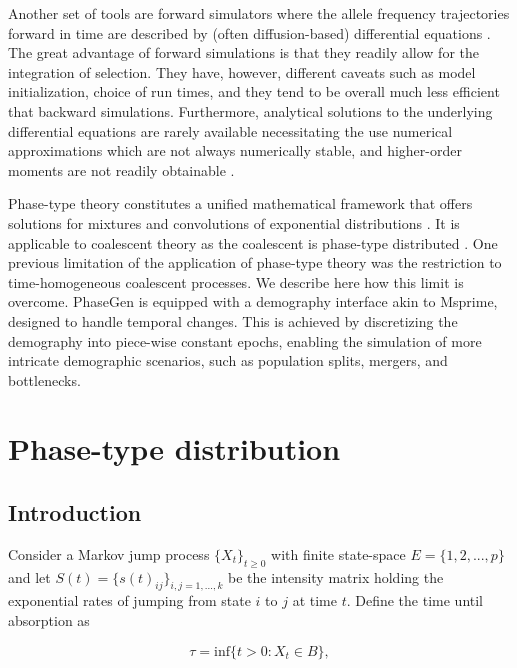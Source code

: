 \documentclass[hidelinks,11pt]{article}
\begin{document}
Another set of tools are forward simulators where the allele frequency trajectories forward in time are described by (often diffusion-based) differential equations \citep{dadi,moments}. 
The great advantage of forward simulations is that they readily allow for the integration of selection. They have, however, different caveats such as model initialization, choice of run times, and they tend to be overall much less efficient that backward simulations. %
Furthermore, analytical solutions to the underlying differential equations are rarely available necessitating the use numerical approximations which are not always numerically stable, and higher-order moments are not readily obtainable \citep{moments}. %

Phase-type theory constitutes a unified mathematical framework that offers solutions for mixtures and convolutions of exponential distributions \citep{phasetype}. 
It is applicable to coalescent theory as the coalescent is phase-type distributed \citep{phasetype_popgen}. 
One previous limitation of the application of phase-type theory was the restriction to time-homogeneous coalescent processes.
We describe here how this limit is overcome.  %
PhaseGen is equipped with a demography interface akin to Msprime, designed to handle temporal changes. This is achieved by discretizing the demography into piece-wise constant epochs, enabling the simulation of more intricate demographic scenarios, such as population splits, mergers, and bottlenecks.

\section{Phase-type distribution}
\subsection{Introduction}

Consider a Markov jump process $\{X_t\}_{t\geq0}$ with finite state-space $E=\{1, 2, ...,p\}$ and let $S(t)=\{s(t)_{ij} \}_{i,j=1,...,k}$ be the intensity matrix holding the exponential rates of jumping from state $i$ to $j$ at time $t$. Define the time until absorption as


\begin{equation*}
\tau = \text{inf}\{t >0:X_t \in B\},
\end{equation*}
\end{document}
